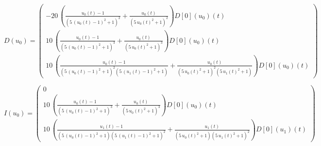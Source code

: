 \documentclass{article}
\begin{document}
\[
  D(u_0) = \left(\begin{array}{r}
-20 \, {\left(\frac{u_{0}\left(t\right) - 1}{{\left(5 \, {\left(u_{0}\left(t\right) - 1\right)}^{2} + 1\right)}^{2}} + \frac{u_{0}\left(t\right)}{{\left(5 \, u_{0}\left(t\right)^{2} + 1\right)}^{2}}\right)} D[0]\left(u_{0}\right)\left(t\right) \\
10 \, {\left(\frac{u_{0}\left(t\right) - 1}{{\left(5 \, {\left(u_{0}\left(t\right) - 1\right)}^{2} + 1\right)}^{3}} + \frac{u_{0}\left(t\right)}{{\left(5 \, u_{0}\left(t\right)^{2} + 1\right)}^{3}}\right)} D[0]\left(u_{0}\right)\left(t\right) \\
10 \, {\left(\frac{u_{0}\left(t\right) - 1}{{\left(5 \, {\left(u_{0}\left(t\right) - 1\right)}^{2} + 1\right)}^{2} {\left(5 \, {\left(u_{1}\left(t\right) - 1\right)}^{2} + 1\right)}} + \frac{u_{0}\left(t\right)}{{\left(5 \, u_{0}\left(t\right)^{2} + 1\right)}^{2} {\left(5 \, u_{1}\left(t\right)^{2} + 1\right)}}\right)} D[0]\left(u_{0}\right)\left(t\right)
\end{array}\right)
\]

\[
  I(u_0) = \left(\begin{array}{r}
0 \\
10 \, {\left(\frac{u_{0}\left(t\right) - 1}{{\left(5 \, {\left(u_{0}\left(t\right) - 1\right)}^{2} + 1\right)}^{3}} + \frac{u_{0}\left(t\right)}{{\left(5 \, u_{0}\left(t\right)^{2} + 1\right)}^{3}}\right)} D[0]\left(u_{0}\right)\left(t\right) \\
10 \, {\left(\frac{u_{1}\left(t\right) - 1}{{\left(5 \, {\left(u_{0}\left(t\right) - 1\right)}^{2} + 1\right)} {\left(5 \, {\left(u_{1}\left(t\right) - 1\right)}^{2} + 1\right)}^{2}} + \frac{u_{1}\left(t\right)}{{\left(5 \, u_{0}\left(t\right)^{2} + 1\right)} {\left(5 \, u_{1}\left(t\right)^{2} + 1\right)}^{2}}\right)} D[0]\left(u_{1}\right)\left(t\right)
\end{array}\right)
\]
\end{document}
